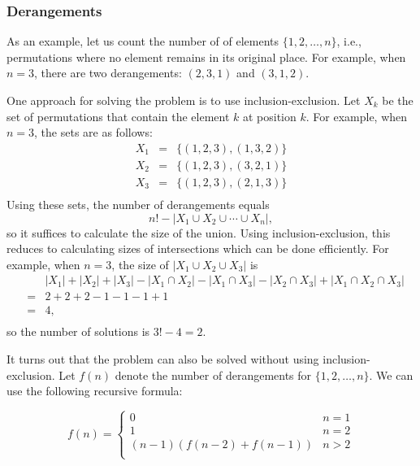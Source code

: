 \subsubsection{Derangements}


As an example, let us count the number of 
of elements $\{1,2,\ldots,n\}$, i.e., permutations
where no element remains in its original place.
For example, when $n=3$, there are
two derangements: $(2,3,1)$ and $(3,1,2)$.

One approach for solving the problem is to use
inclusion-exclusion.
Let $X_k$ be the set of permutations
that contain the element $k$ at position $k$.
For example, when $n=3$, the sets are as follows:
\[
    \begin{array}{lcl}
        X_1 & = & \{(1,2,3),(1,3,2)\} \\
        X_2 & = & \{(1,2,3),(3,2,1)\} \\
        X_3 & = & \{(1,2,3),(2,1,3)\} \\
    \end{array}
\]
Using these sets, the number of derangements equals
\[ n! - |X_1 \cup X_2 \cup \cdots \cup X_n|, \]
so it suffices to calculate the size of the union.
Using inclusion-exclusion, this reduces to
calculating sizes of intersections which can be
done efficiently.
For example, when $n=3$, the size of
$|X_1 \cup X_2 \cup X_3|$ is
\[
    \begin{array}{lcl}
         &   & |X_1| + |X_2| + |X_3| - |X_1 \cap X_2|  - |X_1 \cap X_3|  - |X_2 \cap X_3| + |X_1 \cap X_2 \cap X_3| \\
         & = & 2+2+2-1-1-1+1                                                                                        \\
         & = & 4,                                                                                                   \\
    \end{array}
\]
so the number of solutions is $3!-4=2$.

It turns out that the problem can also be solved
without using inclusion-exclusion.
Let $f(n)$ denote the number of derangements
for $\{1,2,\ldots,n\}$. We can use the following
recursive formula:

\begin{equation*}
    f(n) = \begin{cases}
        0                      & n = 1 \\
        1                      & n = 2 \\
        (n-1)(f(n-2) + f(n-1)) & n>2   \\
    \end{cases}
\end{equation*}

